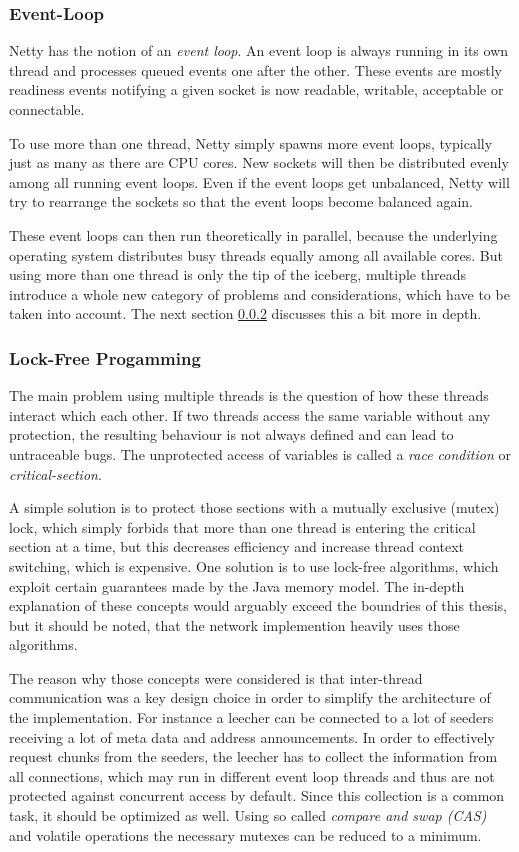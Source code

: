 \subsubsection{Event-Loop}
\label{subsecsec:eventloop}
Netty has the notion of an \emph{event loop}. An event loop is always running in its own thread and processes queued events one after the other. These events are mostly readiness events notifying a given socket is now readable, writable, acceptable or connectable.

To use more than one thread, Netty simply spawns more event loops, typically just as many as there are CPU cores. New sockets will then be distributed evenly among all running event loops. Even if the event loops get unbalanced, Netty will try to rearrange the sockets so that the event loops become balanced again.

These event loops can then run theoretically in parallel, because the underlying operating system distributes busy threads equally among all available cores. But using more than one thread is only the tip of the iceberg, multiple threads introduce a whole new category of problems and considerations, which have to be taken into account. The next section \ref{subsecsec:lockfree} discusses this a bit more in depth.


\subsubsection{Lock-Free Progamming}
\label{subsecsec:lockfree}
The main problem using multiple threads is the question of how these threads interact which each other. If two threads access the same variable without any protection, the resulting behaviour is not always defined and can lead to untraceable bugs. The unprotected access of variables is called a \emph{race condition} or \emph{critical-section}.

A simple solution is to protect those sections with a mutually exclusive (mutex) lock, which simply forbids that more than one thread is entering the critical section at a time, but this decreases efficiency and increase thread context switching, which is expensive. One solution is to use lock-free algorithms, which exploit certain guarantees made by the Java memory model. The in-depth explanation of these concepts would arguably exceed the boundries of this thesis, but it should be noted, that the network implemention heavily uses those algorithms.

The reason why those concepts were considered is that inter-thread communication was a key design choice in order to simplify the architecture of the implementation. For instance a leecher can be connected to a lot of seeders receiving a lot of meta data and address announcements. In order to effectively request chunks from the seeders, the leecher has to collect the information from all connections, which may run in different event loop threads and thus are not protected against concurrent access by default. Since this collection is a common task, it should be optimized as well. Using so called \emph{compare and swap (CAS)} and volatile operations the necessary mutexes can be reduced to a minimum. 

